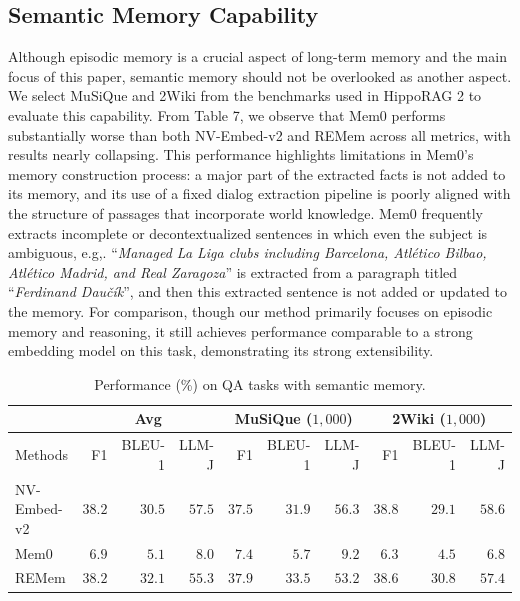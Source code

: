 \documentclass{article} %
\newcommand{\ours}{REMem\xspace}
\begin{document}
\subsection{Semantic Memory Capability}

Although episodic memory is a crucial aspect of long-term memory and the main focus of this paper, semantic memory should not be overlooked as another aspect. 
We select MuSiQue and 2Wiki from the benchmarks used in HippoRAG 2 to evaluate this capability.
From Table 7, we observe that Mem0 performs substantially worse than both NV-Embed-v2 and \ours across all metrics, with results nearly collapsing. 
This performance highlights limitations in Mem0’s memory construction process: a major part of the extracted facts is not added to its memory, and its use of a fixed dialog extraction pipeline is poorly aligned with the structure of passages that incorporate world knowledge. 
Mem0 frequently extracts incomplete or decontextualized sentences in which even the subject is ambiguous, e.g,. ``\textit{Managed La Liga clubs including Barcelona, Atlético Bilbao, Atlético Madrid, and Real Zaragoza}'' is extracted from a paragraph titled ``\textit{Ferdinand Daučík}'', and then this extracted sentence is not added or updated to the memory.
For comparison, though our method primarily focuses on episodic memory and reasoning, it still achieves performance comparable to a strong embedding model on this task, demonstrating its strong extensibility.

\begin{table}[tbh]
\centering
\small
\caption{Performance (\%) on QA tasks with semantic memory.}
\vspace{0.2em}
\begin{tabular}{l|rrr|rrr|rrr}
\toprule
 & \multicolumn{3}{c|}{Avg} & \multicolumn{3}{c|}{MuSiQue ($1,000$)} & \multicolumn{3}{c}{2Wiki ($1,000$)} \\ \midrule
Methods & F1 & BLEU-1 & LLM-J & F1 & BLEU-1 & LLM-J & F1 & BLEU-1 & LLM-J \\ \midrule
NV-Embed-v2 & $38.2$ & $30.5$ & $\mathbf{57.5}$ & $37.5$ & $31.9$ & $\mathbf{56.3}$ & $38.8$ & $29.1$ & $\mathbf{58.6}$ \\
Mem0 & $6.9$ & $5.1$ & $8.0$ & $7.4$ & $5.7$ & $9.2$ & $6.3$ & $4.5$ & $6.8$ \\
\ours & $\mathbf{38.2}$ & $\mathbf{32.1}$ & $55.3$ & $\mathbf{37.9}$ & $\mathbf{33.5}$ & $53.2$ & $\mathbf{38.6}$ & $\mathbf{30.8}$ & $57.4$ \\
\bottomrule
\end{tabular}
\label{tab:semantic memory}
\end{table}
\end{document}
